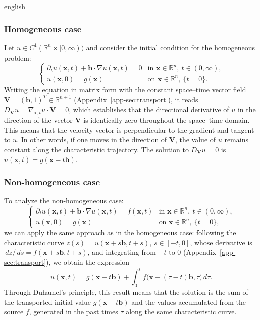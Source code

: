 \documentclass[0000.tex]{subfiles}
\begin{document}
\begin{hyphenrules}{english}
\subsubsection{Homogeneous case}
Let $u\in C^1(\mathbb{R}^n\times[0,\infty))$ and consider the initial condition for the homogeneous problem:
\begin{equation}
  \begin{cases}
    \partial_t u(\mathbf{x},t)+\mathbf{b}\cdot\nabla u(\mathbf{x},t)=0 & \text{in } \mathbf{x}\in\mathbb{R}^n,\ t\in(0,\infty),\\
    u(\mathbf{x},0)=g(\mathbf{x}) & \text{on } \mathbf{x}\in\mathbb{R}^n,\ \{t=0\}.
  \end{cases}
  \label{eq:transport-hom}
\end{equation}
Writing the equation in matrix form with the constant space--time vector field
$\mathbf{V}=(\mathbf{b},1)^{T}\in\mathbb{R}^{n+1}$ (Appendix~\ref{app-sec:transport}), it reads
$D_{\mathbf{V}}u=\nabla_{\mathbf{x},t}u\cdot\mathbf{V}=0$, which establishes that the directional derivative of $u$ in the direction of the vector $\mathbf{V}$ is
identically zero throughout the space--time domain. This means that the velocity vector is perpendicular
to the gradient and tangent to $u$. In other words, if one moves in the direction of
$\mathbf{V}$, the value of $u$ remains constant along the characteristic trajectory. The solution to
$D_{\mathbf{V}}u=0$ is $u(\mathbf{x},t)=g(\mathbf{x}-t\mathbf{b})$.

\subsubsection{Non-homogeneous case}
To analyze the non-homogeneous case:
\begin{equation}
  \begin{cases}
    \partial_t u(\mathbf{x},t)+\mathbf{b}\cdot\nabla u(\mathbf{x},t)=f(\mathbf{x},t) & \text{in } \mathbf{x}\in\mathbb{R}^n,\ t\in(0,\infty),\\
    u(\mathbf{x},0)=g(\mathbf{x}) & \text{on } \mathbf{x}\in\mathbb{R}^n,\ \{t=0\},
  \end{cases}
  \label{eq:transport-nonhom}
\end{equation}
we can apply the same approach as in the homogeneous case: following the characteristic curve
$z(s)=u(\mathbf{x}+s\mathbf{b},t+s)$, $s\in[-t,0]$, whose derivative is $\,d z/\,d s=f(\mathbf{x}+s\mathbf{b},t+s)$,
and integrating from $-t$ to $0$ (Appendix~\ref{app-sec:transport}), we obtain the expression
\begin{equation}
  u(\mathbf{x},t)=g(\mathbf{x}-t\mathbf{b})+\int_{0}^{t}f\big(\mathbf{x}+(\tau-t)\mathbf{b},\tau\big)\,d\tau.
  \label{eq:transport-duhamel}
\end{equation}
Through Duhamel's principle, this result means that the solution is the sum of the transported initial
value $g(\mathbf{x}-t\mathbf{b})$ and the values accumulated from the source $f$, generated in the past times $\tau$
along the same characteristic curve.


\end{hyphenrules}
\end{document}
